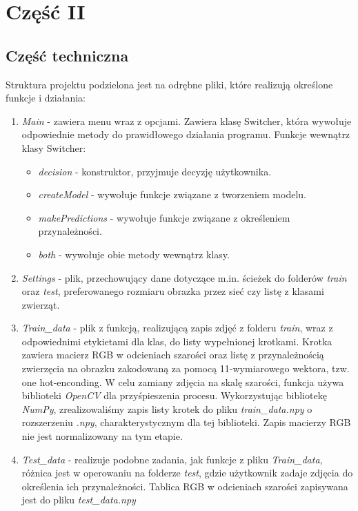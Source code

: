 \documentclass[12pt,a4paper]{article}
\begin{document}
\newpage
	\section{Część II}
	\subsection{Część techniczna}
	Struktura projektu podzielona jest na odrębne pliki, które realizują określone funkcje i działania:
	\begin{enumerate}
        	\item \textit{Main} - zawiera menu wraz z opcjami. Zawiera klasę Switcher, która wywołuje odpowiednie metody do prawidłowego działania programu. Funkcje wewnątrz klasy Switcher:
        	\begin{itemize}
        	    \item \textit{decision} - konstruktor, przyjmuje decyzję użytkownika.
        	    \item \textit{createModel} - wywołuje funkcje związane z tworzeniem modelu.
        	    \item \textit{makePredictions} - wywołuje funkcje związane z określeniem przynależności.
        	    \item \textit{both} - wywołuje obie metody wewnątrz klasy.
        	\end{itemize}
        	\item \textit{Settings} - plik, przechowujący dane dotyczące m.in. ścieżek do folderów \textit{train} oraz \textit{test}, preferowanego rozmiaru obrazka przez sieć czy listę z klasami zwierząt.
        	\item \textit{Train\_data} - plik z funkcją, realizującą zapis zdjęć z folderu \textit{train}, wraz z odpowiednimi etykietami dla klas, do listy wypełnionej krotkami. Krotka zawiera macierz RGB w odcieniach szarości oraz listę z przynależnością zwierzęcia na obrazku zakodowaną za pomocą 11-wymiarowego wektora, tzw. one hot-enconding. W celu zamiany zdjęcia na skalę szarości, funkcja używa biblioteki \textit{OpenCV} dla przyśpieszenia procesu. Wykorzystując bibliotekę \textit{NumPy}, zrealizowaliśmy zapis listy krotek do pliku \textit{train\_data.npy} o rozszerzeniu \textit{.npy}, charakterystycznym dla tej biblioteki. Zapis macierzy RGB nie jest normalizowany na tym etapie.
        	\item \textit{Test\_data} - realizuje podobne zadania, jak funkcje z pliku \textit{Train\_data}, różnica jest w operowaniu na folderze \textit{test}, gdzie użytkownik zadaje zdjęcia do określenia ich przynależności. Tablica RGB w odcieniach szarości zapisywana jest do pliku \textit{test\_data.npy}

\end{enumerate}
\end{document}
